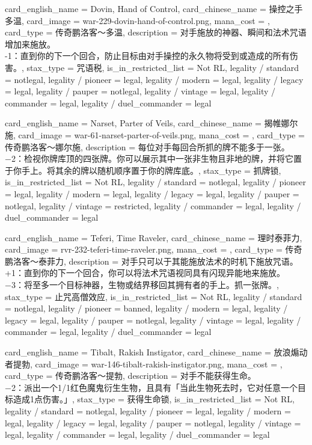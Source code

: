 \documentclass[lang = cn, color = black, 10pt]{AllThatStax}
\begin{document}
\card
{
	card_english_name = {Dovin, Hand of Control},
	card_chinese_name = {操控之手多温},
	card_image = war-229-dovin-hand-of-control.png,
	mana_cost = ,
	card_type = 传奇鹏洛客～多温,
	description = {对手施放的神器、瞬间和法术咒语增加来施放。\\
-1：直到你的下一个回合，防止目标由对手操控的永久物将受到或造成的所有伤害。},
	stax_type = 咒语税,
	is_in_restricted_list = Not RL,
	legality / standard = notlegal,
	legality / pioneer = legal,
	legality / modern = legal,
	legality / legacy = legal,
	legality / pauper = notlegal,
	legality / vintage = legal,
	legality / commander = legal,
	legality / duel_commander = legal
}

\card
{
	card_english_name = {Narset, Parter of Veils},
	card_chinese_name = {揭帷娜尔施},
	card_image = war-61-narset-parter-of-veils.png,
	mana_cost = ,
	card_type = 传奇鹏洛客～娜尔施,
	description = {每位对手每回合所抓的牌不能多于一张。\\
−2：检视你牌库顶的四张牌。你可以展示其中一张非生物且非地的牌，并将它置于你手上。将其余的牌以随机顺序置于你的牌库底。},
	stax_type = 抓牌锁,
	is_in_restricted_list = Not RL,
	legality / standard = notlegal,
	legality / pioneer = legal,
	legality / modern = legal,
	legality / legacy = legal,
	legality / pauper = notlegal,
	legality / vintage = restricted,
	legality / commander = legal,
	legality / duel_commander = legal
}

\card
{
	card_english_name = {Teferi, Time Raveler},
	card_chinese_name = {理时泰菲力},
	card_image = rvr-232-teferi-time-raveler.png,
	mana_cost = ,
	card_type = 传奇鹏洛客～泰菲力,
	description = {对手只可以于其能施放法术的时机下施放咒语。\\
+1：直到你的下一个回合，你可以将法术咒语视同具有闪现异能地来施放。\\
−3：将至多一个目标神器，生物或结界移回其拥有者的手上。抓一张牌。},
	stax_type = 止咒高僧效应,
	is_in_restricted_list = Not RL,
	legality / standard = notlegal,
	legality / pioneer = banned,
	legality / modern = legal,
	legality / legacy = legal,
	legality / pauper = notlegal,
	legality / vintage = legal,
	legality / commander = legal,
	legality / duel_commander = legal
}

\card
{
	card_english_name = {Tibalt, Rakish Instigator},
	card_chinese_name = {放浪煽动者提勃},
	card_image = war-146-tibalt-rakish-instigator.png,
	mana_cost = ,
	card_type = 传奇鹏洛客～提勃,
	description = {对手不能获得生命。\\
−2：派出一个1/1红色魔鬼衍生生物，且具有「当此生物死去时，它对任意一个目标造成1点伤害。」},
	stax_type = 获得生命锁,
	is_in_restricted_list = Not RL,
	legality / standard = notlegal,
	legality / pioneer = legal,
	legality / modern = legal,
	legality / legacy = legal,
	legality / pauper = notlegal,
	legality / vintage = legal,
	legality / commander = legal,
	legality / duel_commander = legal
}
\end{document}
